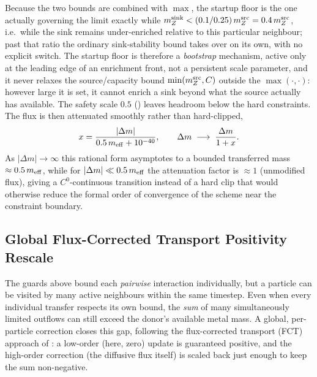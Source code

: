 \documentclass[11pt, a4paper, parskip]{scrartcl}
\newcommand{\code}[1]{\texttt{\seqsplit{#1}}}
\theoremstyle{plain}
\theoremstyle{definition}
\begin{document}
\begin{enumerate}
        Because the two bounds are combined with $\max$, the startup
        floor is the one actually governing the limit exactly while
        $m_Z^{\rm sink} < (0.1/0.25)\,m_Z^{\rm src} = 0.4\,
        m_Z^{\rm src}$, i.e.\ while the sink remains under-enriched
        relative to this particular neighbour; past that ratio the
        ordinary sink-stability bound takes over on its own, with no
        explicit switch. The startup floor is therefore a
        \emph{bootstrap} mechanism, active only at the leading edge of
        an enrichment front, not a persistent scale parameter, and it
        never relaxes the source/capacity bound $\min(m_Z^{\rm src},
        C)$ outside the $\max(\cdot,\cdot)$: however large it is set,
        it cannot enrich a sink beyond what the source actually has
        available. The safety scale $0.5$
        (\code{GEAR\_FVPM\_DIFF\_LIMITER\_SAFETY}) leaves headroom below the
        hard constraints. The flux is then attenuated smoothly rather
        than hard-clipped,
        \begin{equation}
          x = \frac{|\Delta m|}{0.5\, m_{\rm eff} + 10^{-40}} , \qquad
          \Delta m \;\longrightarrow\; \frac{\Delta m}{1+x} .
        \end{equation}
        As $|\Delta m|\to\infty$ this rational form asymptotes to a
        bounded transferred mass $\approx 0.5\,m_{\rm eff}$, while for
        $|\Delta m|\ll 0.5\,m_{\rm eff}$ the attenuation factor is
        $\approx 1$ (unmodified flux), giving a $C^0$-continuous
        transition instead of a hard clip that would otherwise reduce
        the formal order of convergence of the scheme near the
        constraint boundary.
\end{enumerate}

\subsection{Global Flux-Corrected Transport Positivity Rescale}
\label{sec:fct}

The guards above bound each \emph{pairwise} interaction individually, but
a particle can be visited by many active neighbours within the same
timestep. Even when every individual transfer respects its own bound, the
\emph{sum} of many simultaneously limited outflows can still exceed the
donor's available metal mass. A global, per-particle correction closes
this gap, following the flux-corrected transport (FCT) approach of
\citet{Zalesak1979}: a low-order (here, zero) update is guaranteed
positive, and the high-order correction (the diffusive flux itself) is
scaled back just enough to keep the sum non-negative.
\end{document}
